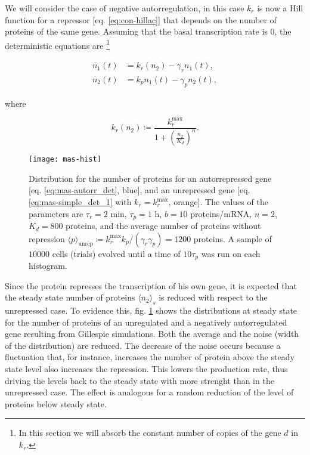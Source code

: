 We will consider the case of negative autorregulation, in this case $k_r$ is now a Hill function for a repressor [eq. \eqref{eq:con-hillac}] that depends on the number of proteins of the same gene. Assuming that the basal transcription rate is $0$, the deterministic equations are \footnote{In this section we will absorb the constant number of copies of the gene $d$ in $k_r$.}

\begin{equation}
  \label{eq:mas-autorr_det}
  \begin{split}
    \dot{n_1}(t) &= k_r(n_2) - \gamma_rn_1(t),\\
    \dot{n_2}(t) &= k_pn_1(t)-\gamma_pn_2(t),
  \end{split}
\end{equation}

where

\begin{equation*}
  k_r(n_2) \coloneqq \frac{k_r^{\text{max}}}{1+\left(\frac{n_2}{K_d}\right)^n}.
\end{equation*}

\begin{figure}[H]
  \centering
  \texttt{[image: mas-hist]}
  \caption[Distribution of proteins for a gene with negative autorregulation]{\label{fig:mas-sim_hist}Distribution for the number of proteins for an autorrepressed gene [eq. \eqref{eq:mas-autorr_det}, blue], and an unrepressed gene [eq. \eqref{eq:mas-simple_det_1} with $k_r = k_r^\text{max}$, orange]. The  values of the parameters are $\tau_r=2$ min, $\tau_p=1$ h, $b=10$ proteins/mRNA, $n=2$, $K_d=800$ proteins, and the average number of proteins without repression $\langle p\rangle_\text{unrep} \coloneqq k_r^\text{max}k_p/(\gamma_r\gamma_p) = 1200$ proteins. A sample of $10000$ cells (trials) evolved until a time of $10\tau_p$ was run on each histogram.}
\end{figure}

Since the protein represses the transcription of his own gene, it is expected that the steady state number of proteins $\langle n_2\rangle_s$ is reduced with respect to the unrepressed case. To evidence this, fig. \ref{fig:mas-sim_hist} shows the distributions at steady state for the number of proteins of an unregulated and a negatively autorregulated gene resulting from Gillespie simulations. Both the average and the noise (width of the distribution) are reduced. The decrease of the noise occurs because a fluctuation that, for instance, increases the number of protein above the steady state level also increases the repression. This lowers the production rate, thus driving the levels back to the steady state with more strenght than in the unrepressed case. The effect is analogous for a random reduction of the level of proteins below steady state.


